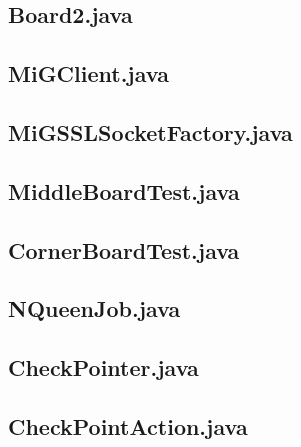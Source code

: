 \begin{landscape}
\subsection{Board2.java}\label{board2}

\subsection{MiGClient.java}\label{migclient}

\subsection{MiGSSLSocketFactory.java}\label{migsslsocketfactory}

\subsection{MiddleBoardTest.java}\label{middleboardtest}

\subsection{CornerBoardTest.java}\label{cornerboardtest}

\subsection{NQueenJob.java}\label{nqueenjob}

\subsection{CheckPointer.java}\label{checkpointer}

\subsection{CheckPointAction.java}\label{checkpointaction}


\end{landscape}
